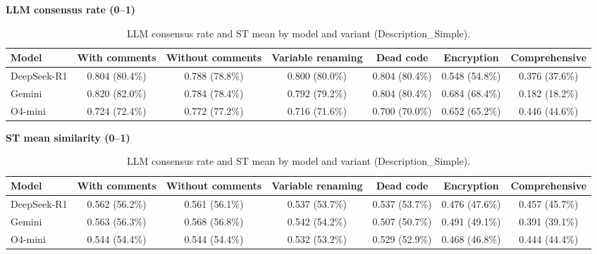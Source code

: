 \begin{table}[htbp]
\centering
\caption{LLM consensus rate and ST mean by model and variant (Description\_Simple).}
\label{tab:all_variants}
\textbf{LLM consensus rate (0--1)}
\begin{tabular}{l|cccccc}
\toprule
\textbf{Model} & With comments & Without comments & Variable renaming & Dead code & Encryption & Comprehensive \\
\midrule
DeepSeek-R1 & 0.804 (80.4\%) & 0.788 (78.8\%) & 0.800 (80.0\%) & 0.804 (80.4\%) & 0.548 (54.8\%) & 0.376 (37.6\%) \\
Gemini & 0.820 (82.0\%) & 0.784 (78.4\%) & 0.792 (79.2\%) & 0.804 (80.4\%) & 0.684 (68.4\%) & 0.182 (18.2\%) \\
O4-mini & 0.724 (72.4\%) & 0.772 (77.2\%) & 0.716 (71.6\%) & 0.700 (70.0\%) & 0.652 (65.2\%) & 0.446 (44.6\%) \\
\bottomrule
\end{tabular}
\vspace{1em}
\textbf{ST mean similarity (0--1)}
\begin{tabular}{l|cccccc}
\toprule
\textbf{Model} & With comments & Without comments & Variable renaming & Dead code & Encryption & Comprehensive \\
\midrule
DeepSeek-R1 & 0.562 (56.2\%) & 0.561 (56.1\%) & 0.537 (53.7\%) & 0.537 (53.7\%) & 0.476 (47.6\%) & 0.457 (45.7\%) \\
Gemini & 0.563 (56.3\%) & 0.568 (56.8\%) & 0.542 (54.2\%) & 0.507 (50.7\%) & 0.491 (49.1\%) & 0.391 (39.1\%) \\
O4-mini & 0.544 (54.4\%) & 0.544 (54.4\%) & 0.532 (53.2\%) & 0.529 (52.9\%) & 0.468 (46.8\%) & 0.444 (44.4\%) \\
\bottomrule
\end{tabular}
\end{table}

